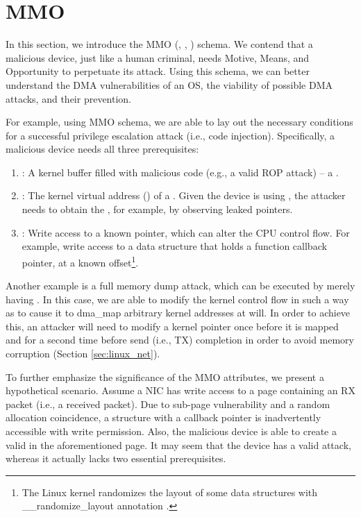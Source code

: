 \section{MMO}\label{sec:mmo}

In this section, we introduce the MMO (\motivation, \means, \oportunity) schema. We contend that a malicious device, just like a human criminal, needs Motive, Means, and Opportunity to perpetuate its attack. Using this schema, we can better understand the DMA vulnerabilities of an OS, the viability of possible DMA attacks, and their prevention. 

For example, using MMO schema, we are able to lay out the necessary conditions for a successful privilege escalation attack (i.e., code injection). Specifically, a malicious device needs all three prerequisites:
\begin{enumerate}
    \item \motivation: A kernel buffer filled with malicious code (e.g., a valid ROP attack) -- a \mabaf.
    \item \means: The kernel virtual address (\kva) of a \mabaf. Given the device is using \iova, the attacker needs to obtain the \kva{}, for example, by observing leaked pointers. 
    \item \oportunity: Write access to a known pointer, which can alter the CPU control flow. For example, write access to a data structure that holds a function callback pointer, at a known offset\footnote{The Linux kernel randomizes the layout of some data structures with \_\_randomize\_layout annotation \cite{rand_layout}.}.
\end{enumerate}

Another example is a full memory dump attack, which can be executed by merely having \oportunity. In this case, we are able to modify the kernel control flow in such a way as to cause it to dma\_map arbitrary kernel addresses at will. In order to achieve this, an attacker will need to modify a kernel pointer once before it is mapped and for a second time before send (i.e., TX) completion in order to avoid memory corruption (Section \ref{sec:linux_net}). 

To further emphasize the significance of the MMO attributes, we present a hypothetical scenario. Assume a NIC has write access to a page containing an RX packet (i.e., a received packet). Due to sub-page vulnerability and a random allocation coincidence, a structure with a callback pointer is inadvertently accessible with write permission. Also, the malicious device is able to create a valid \mabaf{} in the aforementioned page. It may seem that the device has a valid attack, whereas it actually lacks two essential prerequisites.

